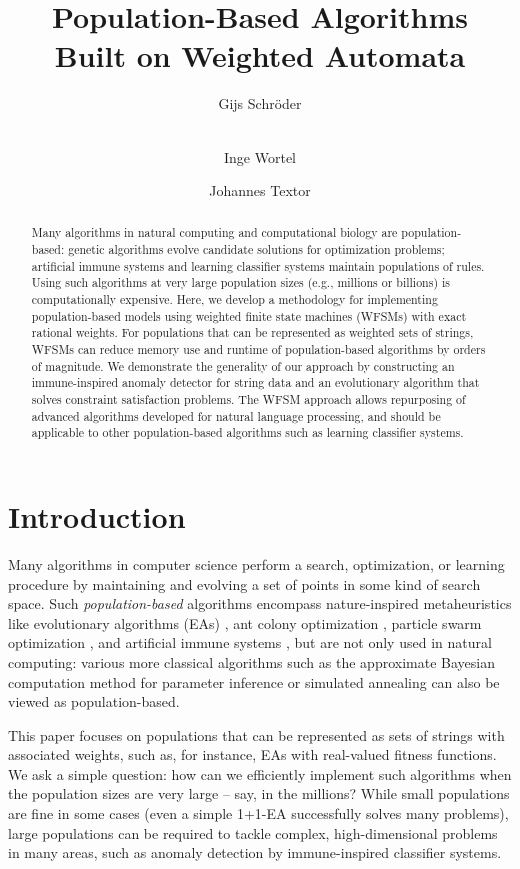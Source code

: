 \documentclass{llncs}
\title{Population-Based Algorithms \\
 Built on Weighted Automata}
\author{Gijs Schr\"oder\orcidID{0000-0001-6803-3237} \and \\ Inge Wortel\orcidID{0000-0003-3362-5229}  \and Johannes Textor\orcidID{0000-0002-0459-9458}}
\institute{Radboud University \and \email{\{gijs.schroeder,inge.wortel,johannes.textor\}@ru.nl} }
\begin{document}
\maketitle

\begin{abstract}

  Many algorithms in natural computing and computational biology are
population-based: genetic algorithms evolve candidate solutions for
optimization problems; artificial immune systems and learning classifier
systems maintain populations of rules. Using such algorithms at very large
population sizes (e.g., millions or billions) is computationally
expensive.  Here, we develop a methodology for implementing population-based
models using  weighted finite state machines (WFSMs) with exact rational
weights.  For populations that can be represented as weighted sets of strings,
WFSMs can reduce memory use and runtime of population-based algorithms by
orders of magnitude.  We demonstrate the generality of our approach by
constructing an immune-inspired anomaly detector for string data and an
evolutionary algorithm that solves constraint satisfaction problems.  The WFSM
approach allows repurposing of advanced algorithms developed for natural
language processing, and should be applicable to other population-based
algorithms such as learning classifier systems.

\end{abstract}


\section{Introduction}

Many algorithms in computer science perform a search, optimization, or learning procedure by maintaining and evolving a set of points in some kind of search space. Such \emph{population-based} algorithms \cite{Blum_2003} encompass nature-inspired metaheuristics like evolutionary algorithms (EAs) \cite{Jansen2013}, ant colony optimization \cite{Blum2005}, particle swarm optimization \cite{Gad2022}, and artificial immune systems \cite{Timmis2004}, but are not only used in natural computing: various more classical algorithms such as the approximate Bayesian computation method for parameter inference \cite{Sisson2007} %
or simulated annealing can also be viewed as population-based.

This paper focuses on populations that can be represented as sets of strings with associated weights, such as, for instance, EAs with real-valued fitness functions. We ask a simple question: how can we efficiently implement such algorithms when the population sizes are very large -- say, in the millions? While small populations are fine in some cases (even a simple 1+1-EA  successfully solves many problems), large populations can be required to tackle complex, high-dimensional problems in many areas, such as anomaly detection by immune-inspired classifier systems. 
\end{document}
